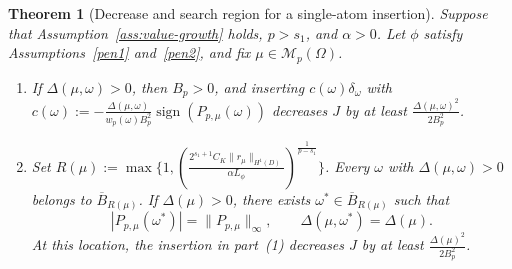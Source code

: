 \documentclass[11pt]{amsart}
\newtheorem{theorem}{Theorem}[section]
\theoremstyle{definition}
\theoremstyle{remark}
\DeclareMathOperator{\sign}{sign}
\begin{document}
\begin{theorem}[Decrease and search region for a single-atom insertion]
\label{thm:quantitative-insertion}
Suppose that Assumption~\ref{ass:value-growth} holds, $p>s_1$, and
$\alpha>0$. Let $\phi$ satisfy Assumptions~\ref{pen1} and~\ref{pen2}, and
fix $\mu\in\mathcal M_p(\Omega)$.
\begin{enumerate}
	\item If $\Delta(\mu,\omega)>0$, then $B_p>0$, and inserting
	$c(\omega)\delta_\omega$ with
	$c(\omega):=-\frac{\Delta(\mu,\omega)}{w_p(\omega)B_p^2}
	\sign(P_{p,\mu}(\omega))$
	decreases $J$ by at least $\frac{\Delta(\mu,\omega)^2}{2B_p^2}$.
	\item Set $R(\mu):=\max\{1,
	(\frac{2^{s_1+1}C_K\|r_\mu\|_{H^1(D)}}{\alpha L_\phi})^{\frac{1}{p-s_1}}\}$.
Every $\omega$ with $\Delta(\mu,\omega)>0$ belongs to
$\overline B_{R(\mu)}$. If $\Delta(\mu)>0$, there exists
$\omega^*\in\overline B_{R(\mu)}$ such that
\begin{equation*}
	|P_{p,\mu}(\omega^*)|=\|P_{p,\mu}\|_\infty,
	\qquad \Delta(\mu,\omega^*)=\Delta(\mu).
\end{equation*}
At this location, the insertion in part~(1) decreases $J$ by at least
$\frac{\Delta(\mu)^2}{2B_p^2}$.
\end{enumerate}
\end{theorem}
\end{document}
